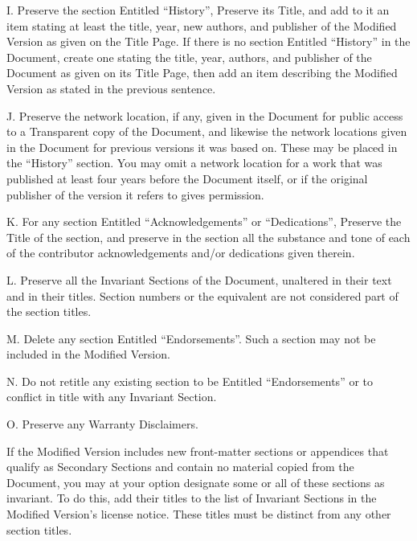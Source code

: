 {\tiny{}I. Preserve the section Entitled \textsf{``}History\textsf{''}, Preserve its
Title, and add to it an item stating at least the title, year, new
authors, and publisher of the Modified Version as given on the Title
Page. If there is no section Entitled \textquotedblleft History\textquotedblright{}
in the Document, create one stating the title, year, authors, and
publisher of the Document as given on its Title Page, then add an
item describing the Modified Version as stated in the previous sentence.}{\tiny\par}

{\tiny{}J. Preserve the network location, if any, given in the Document
for public access to a Transparent copy of the Document, and likewise
the network locations given in the Document for previous versions
it was based on. These may be placed in the \textsf{``}History\textsf{''} section.
You may omit a network location for a work that was published at least
four years before the Document itself, or if the original publisher
of the version it refers to gives permission.}{\tiny\par}

{\tiny{}K. For any section Entitled \textsf{``}Acknowledgements\textsf{''} or \textsf{``}Dedications\textsf{''},
Preserve the Title of the section, and preserve in the section all
the substance and tone of each of the contributor acknowledgements
and/or dedications given therein.}{\tiny\par}

{\tiny{}L. Preserve all the Invariant Sections of the Document, unaltered
in their text and in their titles. Section numbers or the equivalent
are not considered part of the section titles.}{\tiny\par}

{\tiny{}M. Delete any section Entitled \textsf{``}Endorsements\textsf{''}. Such a
section may not be included in the Modified Version.}{\tiny\par}

{\tiny{}N. Do not retitle any existing section to be Entitled \textsf{``}Endorsements\textsf{''}
or to conflict in title with any Invariant Section.}{\tiny\par}

{\tiny{}O. Preserve any Warranty Disclaimers.}{\tiny\par}

{\tiny{}If the Modified Version includes new front-matter sections
or appendices that qualify as Secondary Sections and contain no material
copied from the Document, you may at your option designate some or
all of these sections as invariant. To do this, add their titles to
the list of Invariant Sections in the Modified Version\textsf{'}s license notice.
These titles must be distinct from any other section titles.}{\tiny\par}

